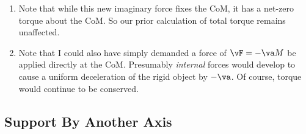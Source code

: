 \begin{enumerate}
  \item Note that while this new imaginary force fixes the CoM, it has a
  net-zero torque about the CoM. So our prior calculation of total
  torque remains unaffected.

  \item Note that I could also have simply demanded a force of $\vF =
  -\va M$ be applied directly at the CoM. Presumably \emph{internal}
  forces would develop to cause a uniform deceleration of the rigid
  object by $-\va$. Of course, torque would continue to be conserved.
\end{enumerate}

\subsection{Support By Another Axis}

